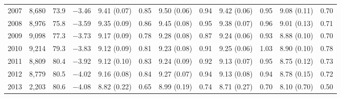 \begin{tabular}{rrrrcccccccc}
2007 & 8,680 & 73.9 & $-$3.46 & 9.41 (0.07) & 0.85 & 9.50 (0.06) & 0.94 & 9.42 (0.06) & 0.95 & 9.08 (0.11) & 0.70 \\
2008 & 8,976 & 75.8 & $-$3.59 & 9.35 (0.09) & 0.86 & 9.45 (0.08) & 0.95 & 9.38 (0.07) & 0.96 & 9.01 (0.13) & 0.71 \\
2009 & 9,098 & 77.3 & $-$3.73 & 9.17 (0.09) & 0.78 & 9.28 (0.08) & 0.87 & 9.24 (0.06) & 0.93 & 8.88 (0.10) & 0.70 \\
2010 & 9,214 & 79.3 & $-$3.83 & 9.12 (0.09) & 0.81 & 9.23 (0.08) & 0.91 & 9.25 (0.06) & 1.03 & 8.90 (0.10) & 0.78 \\
2011 & 8,809 & 80.4 & $-$3.92 & 9.12 (0.10) & 0.83 & 9.24 (0.09) & 0.92 & 9.13 (0.07) & 0.95 & 8.75 (0.12) & 0.73 \\
2012 & 8,779 & 80.5 & $-$4.02 & 9.16 (0.08) & 0.84 & 9.27 (0.07) & 0.94 & 9.13 (0.08) & 0.94 & 8.78 (0.15) & 0.72 \\
2013 & 2,203 & 80.6 & $-$4.08 & 8.82 (0.22) & 0.65 & 8.99 (0.19) & 0.74 & 8.71 (0.27) & 0.70 & 8.10 (0.70) & 0.50 \\
\bottomrule
\end{tabular}
